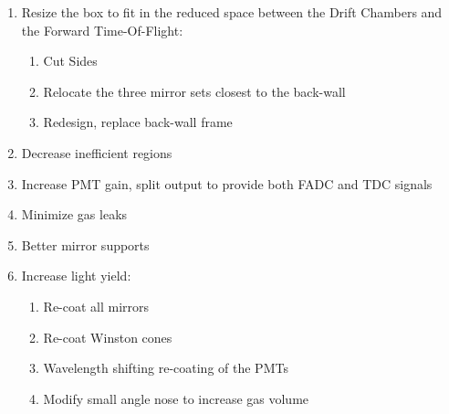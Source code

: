 \begin{enumerate}
\item Resize the box to fit in the reduced space between the Drift Chambers and the Forward Time-Of-Flight:
	\begin{enumerate}
		\item Cut Sides
		\item Relocate the three mirror sets closest to the back-wall
		\item Redesign, replace back-wall frame
	\end{enumerate}

	\item Decrease inefficient regions
	\item Increase PMT gain, split output to provide both FADC and TDC signals
	\item Minimize gas leaks
	\item Better mirror supports
	\item Increase light yield:
	\begin{enumerate}
		\item Re-coat all mirrors
		\item Re-coat Winston cones
		\item Wavelength shifting re-coating of the PMTs
		\item Modify small angle nose to increase gas volume
	\end{enumerate}
\end{enumerate}








